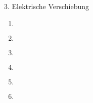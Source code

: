 \documentclass{alex_hü}
\begin{document}
\begin{mybox}{3. Elektrische Verschiebung}
	\centering \( \)
	\tcblower
	\begin{enumerate}
		\item \(  \)
	\tcbline
		\item \(  \)
	\tcbline
		\item \(  \)
	\tcbline
		\item \(  \)
	\tcbline
		\item \(  \)
	\tcbline
		\item \(  \)
	\end{enumerate}
\end{mybox}
\end{document}
